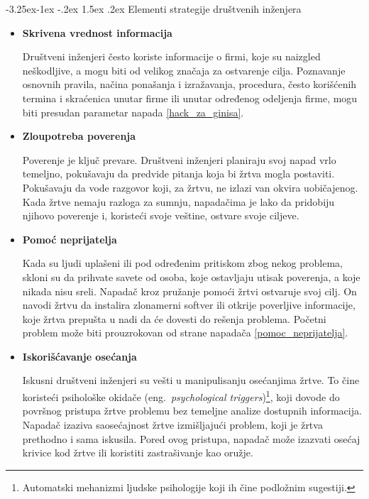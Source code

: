 \documentclass[a4paper]{article}
\makeatletter
\renewcommand\paragraph{\@startsection{paragraph}{4}{\z@}%
   {-3.25ex\@plus -1ex \@minus -.2ex}%
   {1.5ex \@plus .2ex}%
   {\normalfont\normalsize\bfseries}}
\makeatother
\begin{document}
\paragraph{Elementi strategije društvenih inženjera}
\begin{itemize}
\item \textbf{Skrivena vrednost informacija}

Društveni inženjeri često koriste informacije o firmi, koje su naizgled neškodljive, a mogu biti od velikog značaja za ostvarenje cilja. Poznavanje osnovnih pravila, načina ponašanja i izražavanja, procedura, često korišćenih termina i skraćenica unutar firme ili unutar određenog odeljenja firme, mogu biti presudan parametar napada \ref{hack_za_ginisa}.

\item \textbf{Zloupotreba poverenja}

Poverenje je ključ prevare. Društveni inženjeri planiraju svoj napad vrlo temeljno, pokušavaju da predvide pitanja koja bi žrtva mogla postaviti. Pokušavaju da vode razgovor koji, za žrtvu, ne izlazi van okvira uobičajenog. Kada žrtve nemaju razloga za sumnju, napadačima je lako da pridobiju njihovo poverenje i, koristeći svoje veštine, ostvare svoje ciljeve.

\item \textbf{Pomoć neprijatelja}

Kada su ljudi uplašeni ili pod određenim pritiskom zbog nekog problema, skloni su da prihvate savete od osoba, koje ostavljaju utisak poverenja, a koje nikada nisu sreli. Napadač kroz pružanje pomoći žrtvi ostvaruje svoj cilj. On navodi žrtvu da instalira zlonamerni softver ili otkrije poverljive informacije, koje žrtva prepušta u nadi da će dovesti do rešenja problema. Početni problem može biti prouzrokovan od strane napadača \ref{pomoc_neprijatelja}.

\item \textbf{Iskorišćavanje osećanja}

Iskusni društveni inženjeri su vešti u manipulisanju osećanjima žrtve. To čine koristeći psihološke okidače (eng.~{\em psychological triggers})\footnote{Automatski mehanizmi ljudske psihologije koji ih čine podložnim sugestiji.}, koji dovode do površnog pristupa žrtve problemu bez temeljne analize dostupnih informacija. Napadač izaziva saosećajnost žrtve izmišljajući problem, koji je žrtva prethodno i sama iskusila. Pored ovog pristupa, napadač može izazvati osećaj krivice kod žrtve ili koristiti zastrašivanje kao oružje.


\end{itemize}
\end{document}
